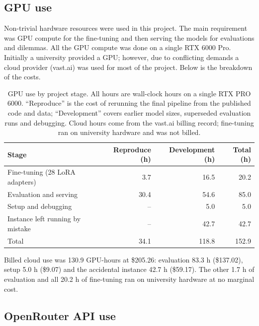 \subsection{GPU use}
\label{app:gpu-use}

Non-trivial hardware resources were used in this project. The main requirement was GPU compute for the fine-tuning and then serving the models for evaluations and dilemmas. All the GPU compute was done on a single RTX 6000 Pro. Initially a university provided a GPU; however, due to conflicting demands a cloud provider (vast.ai) was used for most of the project. Below is the breakdown of the costs.

\begin{table}[t]
	\centering
	\caption{GPU use by project stage. All hours are wall-clock hours on a
		single RTX PRO 6000. ``Reproduce'' is the cost of rerunning the final
		pipeline from the published code and data; ``Development'' covers
		earlier model sizes, superseded evaluation runs and debugging. Cloud
		hours come from the vast.ai billing record; fine-tuning ran on
		university hardware and was not billed.}
	\label{tab:gpu-use}
	\begin{tabular}{@{}lrrr@{}}
		\toprule
		Stage & Reproduce (h) & Development (h) & Total (h) \\
		\midrule
		Fine-tuning (28 LoRA adapters)   & 3.7  & 16.5 & 20.2 \\
		Evaluation and serving           & 30.4 & 54.6 & 85.0 \\
		Setup and debugging              & --   & 5.0  & 5.0  \\
		Instance left running by mistake & --   & 42.7 & 42.7 \\
		\midrule
		Total                            & 34.1 & 118.8 & 152.9 \\
		\bottomrule
	\end{tabular}

	\smallskip
	\footnotesize{Billed cloud use was 130.9 GPU-hours at \$205.26:
		evaluation 83.3 h (\$137.02), setup 5.0 h (\$9.07) and the accidental
		instance 42.7 h (\$59.17). The other 1.7 h of evaluation and all
		20.2 h of fine-tuning ran on university hardware at no marginal cost.}
\end{table}

\subsection{OpenRouter API use}
\label{app:openrouter-use}

